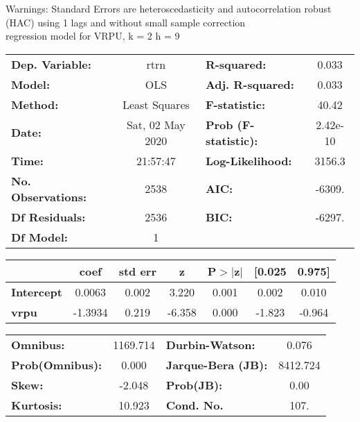 Warnings: \newline
 [1] Standard Errors are heteroscedasticity and autocorrelation robust (HAC) using 1 lags and without small sample correction\\ 

regression model for VRPU, k = 2 h = 9\begin{center}
\begin{tabular}{lclc}
\toprule
\textbf{Dep. Variable:}    &       rtrn       & \textbf{  R-squared:         } &     0.033   \\
\textbf{Model:}            &       OLS        & \textbf{  Adj. R-squared:    } &     0.033   \\
\textbf{Method:}           &  Least Squares   & \textbf{  F-statistic:       } &     40.42   \\
\textbf{Date:}             & Sat, 02 May 2020 & \textbf{  Prob (F-statistic):} &  2.42e-10   \\
\textbf{Time:}             &     21:57:47     & \textbf{  Log-Likelihood:    } &    3156.3   \\
\textbf{No. Observations:} &        2538      & \textbf{  AIC:               } &    -6309.   \\
\textbf{Df Residuals:}     &        2536      & \textbf{  BIC:               } &    -6297.   \\
\textbf{Df Model:}         &           1      & \textbf{                     } &             \\
\bottomrule
\end{tabular}
\begin{tabular}{lcccccc}
                   & \textbf{coef} & \textbf{std err} & \textbf{z} & \textbf{P$> |$z$|$} & \textbf{[0.025} & \textbf{0.975]}  \\
\midrule
\textbf{Intercept} &       0.0063  &        0.002     &     3.220  &         0.001        &        0.002    &        0.010     \\
\textbf{vrpu}      &      -1.3934  &        0.219     &    -6.358  &         0.000        &       -1.823    &       -0.964     \\
\bottomrule
\end{tabular}
\begin{tabular}{lclc}
\textbf{Omnibus:}       & 1169.714 & \textbf{  Durbin-Watson:     } &    0.076  \\
\textbf{Prob(Omnibus):} &   0.000  & \textbf{  Jarque-Bera (JB):  } & 8412.724  \\
\textbf{Skew:}          &  -2.048  & \textbf{  Prob(JB):          } &     0.00  \\
\textbf{Kurtosis:}      &  10.923  & \textbf{  Cond. No.          } &     107.  \\
\bottomrule
\end{tabular}
\end{center}

